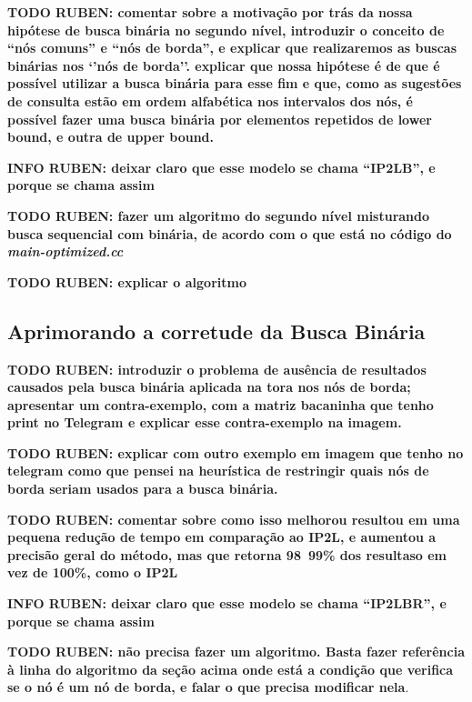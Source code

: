 \textbf{TODO RUBEN: comentar sobre a motivação por trás da nossa hipótese de busca binária no segundo nível, introduzir o conceito de ``nós comuns'' e ``nós de borda'',  e explicar que realizaremos as buscas binárias nos `'nós de borda''. explicar que nossa hipótese é de que é possível utilizar a busca binária para esse fim e que, como as sugestões de consulta estão em ordem alfabética nos intervalos dos nós, é possível fazer uma busca binária por elementos repetidos de lower bound, e outra de upper bound. }

\textbf{INFO RUBEN: deixar claro que esse modelo se chama ``IP2LB'', e porque se chama assim}

\textbf{TODO RUBEN: fazer um algoritmo do segundo nível misturando busca sequencial com binária, de acordo com o que está no código do \textit{main-optimized.cc}}

\textbf{TODO RUBEN: explicar o algoritmo }

\subsection{Aprimorando a corretude da Busca Binária}

\textbf{TODO RUBEN: introduzir o problema de ausência de resultados causados pela busca binária aplicada na tora nos nós de borda; apresentar um contra-exemplo, com a matriz bacaninha que tenho print no Telegram e explicar esse contra-exemplo na imagem.}

\textbf{TODO RUBEN: explicar com outro exemplo em imagem que tenho no telegram como que pensei na heurística de restringir quais nós de borda seriam usados para a busca binária.}

\textbf{TODO RUBEN: comentar sobre como isso melhorou resultou em uma pequena redução de tempo em comparação ao IP2L, e aumentou a precisão geral do método, mas que retorna 98~99\% dos resultaso em vez de 100\%, como o IP2L}

\textbf{INFO RUBEN: deixar claro que esse modelo se chama ``IP2LBR'', e porque se chama assim}

\textbf{TODO RUBEN: não precisa fazer um algoritmo. Basta fazer referência à linha do algoritmo da seção acima onde está a condição que verifica se o nó é um nó de borda, e falar o que precisa modificar nela}.



